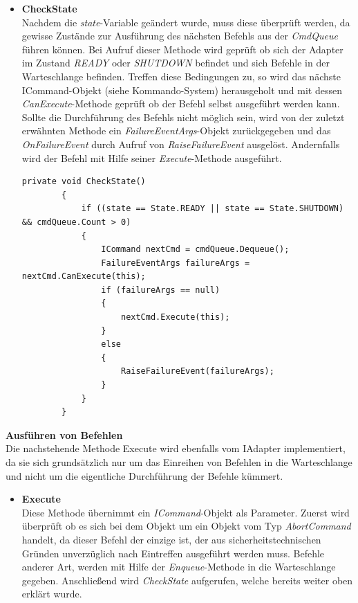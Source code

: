 \begin{itemize}
\item \textbf{CheckState}\\
Nachdem die \textit{state}-Variable geändert wurde, muss diese überprüft werden, da gewisse Zustände zur Ausführung des nächsten Befehls aus der \textit{CmdQueue} führen können. Bei Aufruf dieser Methode wird geprüft ob sich der Adapter im Zustand \textit{READY} oder \textit{SHUTDOWN} befindet und sich Befehle in der Warteschlange befinden. Treffen diese Bedingungen zu, so wird das nächste ICommand-Objekt (siehe Kommando-System) herausgeholt und mit dessen \textit{CanExecute}-Methode geprüft ob der Befehl selbst ausgeführt werden kann. \\
Sollte die Durchführung des Befehls nicht möglich sein, wird von der zuletzt erwähnten Methode ein \textit{FailureEventArgs}-Objekt zurückgegeben und das \textit{OnFailureEvent} durch Aufruf von \textit{RaiseFailureEvent} ausgelöst. Andernfalls wird der Befehl mit Hilfe seiner \textit{Execute}-Methode ausgeführt.

\begin{lstlisting}[language = CSharp, captionpos=b, caption={Die CheckState-Methode des IAdapters}]
private void CheckState()
        {
            if ((state == State.READY || state == State.SHUTDOWN) && cmdQueue.Count > 0)
            {
                ICommand nextCmd = cmdQueue.Dequeue();
                FailureEventArgs failureArgs = nextCmd.CanExecute(this);
                if (failureArgs == null)
                {
                    nextCmd.Execute(this);
                }
                else
                {
                    RaiseFailureEvent(failureArgs);
                }
            }
        }
\end{lstlisting}
\end{itemize}

\textbf{Ausführen von Befehlen}\\
Die nachstehende Methode {Execute} wird ebenfalls vom IAdapter implementiert, da sie sich grundsätzlich nur um das Einreihen von Befehlen in die Warteschlange und nicht um die eigentliche Durchführung der Befehle kümmert.
\begin{itemize}
\item \textbf{Execute}\\
Diese Methode übernimmt ein \textit{ICommand}-Objekt als Parameter. Zuerst wird überprüft ob es sich bei dem Objekt um ein Objekt vom Typ \textit{AbortCommand} handelt, da dieser Befehl der einzige ist, der aus sicherheitstechnischen Gründen unverzüglich nach Eintreffen ausgeführt werden muss. Befehle anderer Art, werden mit Hilfe der \textit{Enqueue}-Methode in die Warteschlange gegeben. Anschließend wird \textit{CheckState} aufgerufen, welche bereits weiter oben erklärt wurde.\\

\end{itemize}

